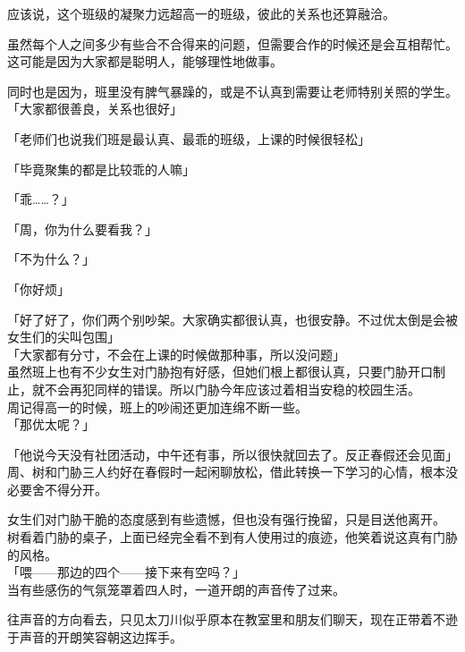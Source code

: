 应该说，这个班级的凝聚力远超高一的班级，彼此的关系也还算融洽。

虽然每个人之间多少有些合不合得来的问题，但需要合作的时候还是会互相帮忙。这可能是因为大家都是聪明人，能够理性地做事。

同时也是因为，班里没有脾气暴躁的，或是不认真到需要让老师特别关照的学生。\\

「大家都很善良，关系也很好」

「老师们也说我们班是最认真、最乖的班级，上课的时候很轻松」

「毕竟聚集的都是比较乖的人嘛」

「乖……？」

「周，你为什么要看我？」

「不为什么？」

「你好烦」

「好了好了，你们两个别吵架。大家确实都很认真，也很安静。不过优太倒是会被女生们的尖叫包围」\\

「大家都有分寸，不会在上课的时候做那种事，所以没问题」\\

虽然班上也有不少女生对门胁抱有好感，但她们根上都很认真，只要门胁开口制止，就不会再犯同样的错误。所以门胁今年应该过着相当安稳的校园生活。\\

周记得高一的时候，班上的吵闹还更加连绵不断一些。\\

「那优太呢？」

「他说今天没有社团活动，中午还有事，所以很快就回去了。反正春假还会见面」\\

周、树和门胁三人约好在春假时一起闲聊放松，借此转换一下学习的心情，根本没必要舍不得分开。

女生们对门胁干脆的态度感到有些遗憾，但也没有强行挽留，只是目送他离开。\\

树看着门胁的桌子，上面已经完全看不到有人使用过的痕迹，他笑着说这真有门胁的风格。\\

「喂——那边的四个——接下来有空吗？」\\

当有些感伤的气氛笼罩着四人时，一道开朗的声音传了过来。

往声音的方向看去，只见太刀川似乎原本在教室里和朋友们聊天，现在正带着不逊于声音的开朗笑容朝这边挥手。\\

